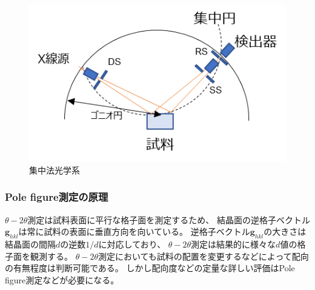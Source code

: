 \documentclass[dvipdfmx,12pt,a4paper]{jreport}
\begin{document}
			\newpage
			\begin{figure}[h]
				\centering
				\includegraphics[scale=1.3]{XRD_theta_2theta_光学系.png}
				\caption{集中法光学系}
				\label{集中法光学系}
			\end{figure}

			\subsubsection{Pole figure測定の原理}
			$\theta-2\theta$測定は試料表面に平行な格子面を測定するため、
			結晶面の逆格子ベクトル$\bm{g}_{hkl}$は常に試料の表面に垂直方向を向いている。
			逆格子ベクトル$\bm{g}_{hkl}$の大きさは結晶面の間隔$d$の逆数$1/d$に対応しており、
			$\theta-2\theta$測定は結果的に様々な$d$値の格子面を観測する。
			$\theta-2\theta$測定においても試料の配置を変更するなどによって配向の有無程度は判断可能である。
			しかし配向度などの定量な詳しい評価はPole figure測定などが必要になる。
			
\end{document}
